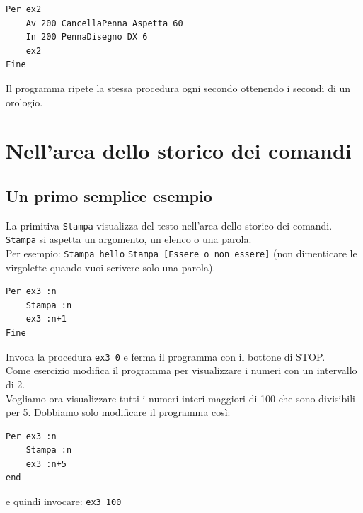 \begin{lstlisting}[caption="La lancetta dei secondi di un orologio"]
Per ex2
	Av 200 CancellaPenna Aspetta 60
	In 200 PennaDisegno DX 6
	ex2
Fine
\end{lstlisting}
Il programma ripete la stessa procedura ogni secondo ottenendo i secondi di un orologio.




\section{Nell'area dello storico dei comandi}
\subsection{Un primo semplice esempio}

\noindent La primitiva \texttt{Stampa} visualizza del testo nell'area dello storico dei comandi. \texttt{Stampa} si aspetta un argomento, un elenco o una parola.\\
Per esempio: \texttt{Stampa \textquotedbl hello} \texttt{Stampa [Essere o non essere]} (non dimenticare le virgolette \textquotedbl quando vuoi scrivere solo una parola).
\begin{lstlisting}[caption="Stampare un elenco infinito di numeri"]
Per ex3 :n
	Stampa :n
	ex3 :n+1
Fine
\end{lstlisting}
Invoca la procedura \texttt{ex3 0} e ferma il programma con il bottone di STOP.\\
Come esercizio modifica il programma per visualizzare i numeri con un intervallo di 2.\\

Vogliamo ora visualizzare tutti i numeri interi maggiori di 100 che sono divisibili per 5. Dobbiamo solo modificare il programma così:
\begin{lstlisting}[caption="Stampare un elenco di numeri divisibili per 5"]
Per ex3 :n
	Stampa :n
	ex3 :n+5
end
\end{lstlisting}
e quindi invocare: \texttt{ex3 100}


